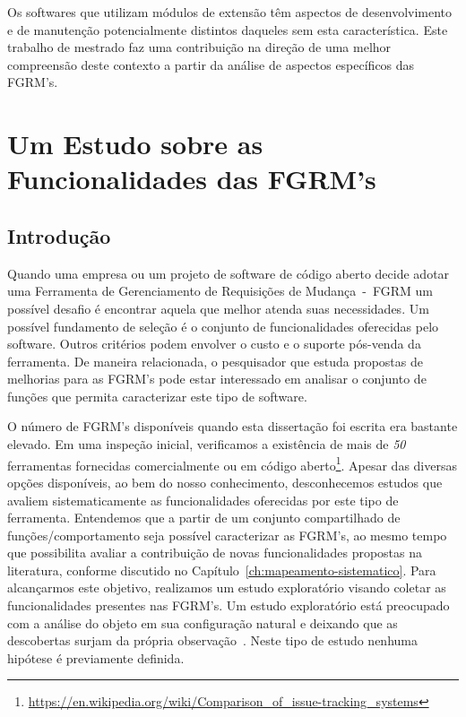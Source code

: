 Os softwares que utilizam módulos de extensão têm aspectos de desenvolvimento e
de manutenção potencialmente distintos daqueles sem esta característica. Este
trabalho de mestrado faz uma contribuição na direção de uma melhor compreensão
deste contexto a partir da análise de aspectos específicos das FGRM's.

\section{Um Estudo sobre as Funcionalidades das FGRM's}
\label{sec:caracterizacao_ferramentas}

\subsection{Introdução}
\label{subsec:caracterizacao_intro}
Quando uma empresa ou um projeto de software de código aberto decide adotar uma
Ferramenta de Gerenciamento de Requisições de Mudança~-~FGRM um possível desafio
é encontrar aquela que melhor atenda suas necessidades. Um possível fundamento
de seleção é o conjunto de funcionalidades oferecidas pelo software. Outros
critérios podem envolver o custo e o suporte pós-venda da ferramenta. De maneira
relacionada, o pesquisador que estuda propostas de melhorias para as FGRM's pode
estar interessado em analisar o conjunto de funções que permita caracterizar
este tipo de software.

O número de FGRM's disponíveis quando esta dissertação foi escrita era bastante
elevado. Em uma inspeção inicial, verificamos a existência de mais de
\textit{50} ferramentas fornecidas comercialmente ou em código
aberto\footnote{\url{https://en.wikipedia.org/wiki/Comparison_of_issue-tracking_systems}}.
Apesar das diversas opções disponíveis, ao bem do nosso conhecimento,
desconhecemos estudos que avaliem sistematicamente as funcionalidades oferecidas
por este tipo de ferramenta. Entendemos que a partir de um conjunto
compartilhado de funções/comportamento seja possível caracterizar as FGRM's, ao
mesmo tempo que possibilita avaliar a contribuição de novas funcionalidades
propostas na li\-te\-ra\-tu\-ra, conforme discutido no
Capítulo~\ref{ch:mapeamento-sistematico}. Para alcançarmos este objetivo,
realizamos um estudo exploratório visando coletar as funcionalidades presentes
nas FGRM's. Um estudo exploratório está preocupado com a análise do objeto em
sua configuração natural e deixando que as descobertas surjam da própria
observação~\cite{wohlin2012experimentation}. Neste tipo de estudo nenhuma
hipótese é previamente definida.

